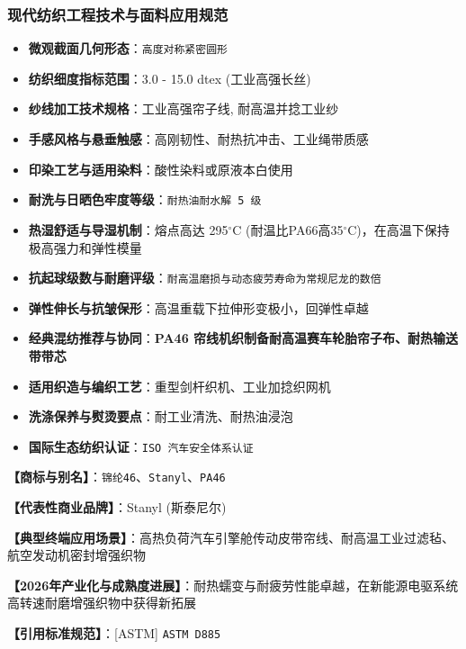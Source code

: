 \documentclass[11pt,openright,twoside,UTF8]{ctexbook}
\begin{document}
\subsubsection*{现代纺织工程技术与面料应用规范}
\begin{itemize} \setlength{\itemsep}{2pt}
    \item \textbf{微观截面几何形态}：\texttt{高度对称紧密圆形}
    \item \textbf{纺织细度指标范围}：3.0 - 15.0 dtex (工业高强长丝)
    \item \textbf{纱线加工技术规格}：工业高强帘子线, 耐高温并捻工业纱
    \item \textbf{手感风格与悬垂触感}：高刚韧性、耐热抗冲击、工业绳带质感
    \item \textbf{印染工艺与适用染料}：酸性染料或原液本白使用
    \item \textbf{耐洗与日晒色牢度等级}：\texttt{耐热油耐水解 5 级}
    \item \textbf{热湿舒适与导湿机制}：熔点高达 295$^\circ\mathrm{C}$ (耐温比PA66高35$^\circ\mathrm{C}$)，在高温下保持极高强力和弹性模量
    \item \textbf{抗起球级数与耐磨评级}：\texttt{耐高温磨损与动态疲劳寿命为常规尼龙的数倍}
    \item \textbf{弹性伸长与抗皱保形}：高温重载下拉伸形变极小，回弹性卓越
    \item \textbf{经典混纺推荐与协同}：\textbf{PA46 帘线机织制备耐高温赛车轮胎帘子布、耐热输送带带芯}
    \item \textbf{适用织造与编织工艺}：重型剑杆织机、工业加捻织网机
    \item \textbf{洗涤保养与熨烫要点}：耐工业清洗、耐热油浸泡
    \item \textbf{国际生态纺织认证}：\texttt{ISO 汽车安全体系认证}
\end{itemize}
\vspace{0.2cm}

\noindent\textbf{【商标与别名】}：\texttt{锦纶46}、\texttt{Stanyl}、\texttt{PA46}\par
\noindent\textbf{【代表性商业品牌】}：Stanyl (斯泰尼尔)\par
\noindent\textbf{【典型终端应用场景】}：高热负荷汽车引擎舱传动皮带帘线、耐高温工业过滤毡、航空发动机密封增强织物\par
\noindent\textbf{【2026年产业化与成熟度进展】}：耐热蠕变与耐疲劳性能卓越，在新能源电驱系统高转速耐磨增强织物中获得新拓展\par
\noindent\textbf{【引用标准规范】}：[ASTM] \texttt{ASTM D885}\par
\vspace{0.5cm}
\end{document}
